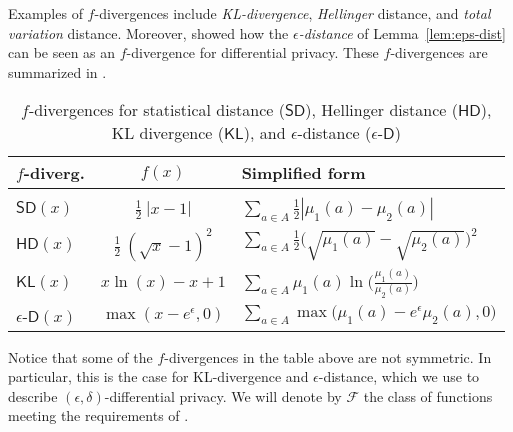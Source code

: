 \documentclass{sig-alternate-05-2015}
\theoremstyle{plain}
\theoremstyle{definition}
\theoremstyle{corollary}
\newcommand{\fdiv}{\ensuremath{f}}
\begin{document}
Examples of \fdiv-divergences include \emph{KL-divergence}, \emph{Hellinger}
distance, and \emph{total variation} distance.  Moreover, \citet{BartheO13}
showed how the \emph{$\epsilon$-distance} of Lemma~\ref{lem:eps-dist} can be seen
as an \fdiv-divergence for differential privacy. These \fdiv-divergences are
summarized in .
\begin{table}[t]
  \begin{tabular}{lcl}
    {\bf \fdiv-diverg.}& ${\fdiv}(x)$ & {\bf Simplified form}\\
    \hline\\
    $\mathsf{SD}(x)$&$\frac{1}{2}\ |x-1|$& $\displaystyle{\sum_{a\in
      A}}\frac{1}{2}|\mu_1(a)-\mu_2(a)|$\\
    $\mathsf{HD}(x)$&$\frac{1}{2}\ (\sqrt{x}-1)^2$& $\displaystyle{\sum_{a\in
      A}}\frac{1}{2}\Big(\sqrt{\mu_1(a)}-\sqrt{\mu_2(a)}\Big)^2$\\
    $\mathsf{KL}(x)$&$x\ln(x)-{x}+1$& $\displaystyle{\sum_{a\in
      A}}\mu_1(a)\ln\Big(\frac{\mu_1(a)}{\mu_2(a)}\Big)$\\
$\epsilon$-$\mathsf{D}(x)$&$\max(x-e^\epsilon,0)$ &$\displaystyle{\sum_{a\in
      A}}\max\Big({\mu_1(a)}- e^\epsilon {\mu_2(a)},0\Big)$
  \end{tabular}
 \caption{$f$-divergences for statistical distance ($\mathsf{SD}$),
   Hellinger distance ($\mathsf{HD}$), KL divergence ($\mathsf{KL}$),
   and $\epsilon$-distance ($\epsilon$-$\mathsf{D}$)}
\label{f_div}
\end{table}
Notice that some of the $\fdiv$-divergences in the table above are not
symmetric. In particular, this is the case for KL-divergence and
$\epsilon$-distance, which we use to describe $(\epsilon,\delta)$-differential
privacy. We will denote by $\mathcal{F}$ the class of functions meeting the 
requirements of .
\end{document}
